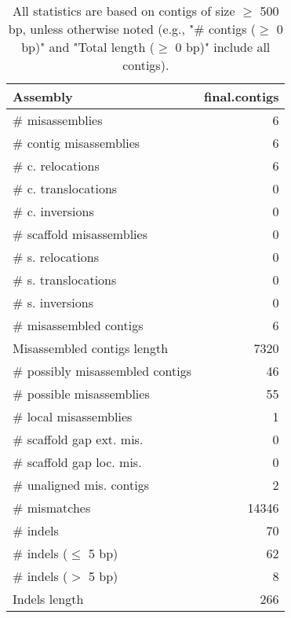 \documentclass[12pt,a4paper]{article}
\begin{document}
\begin{table}[ht]
\begin{center}
\caption{All statistics are based on contigs of size $\geq$ 500 bp, unless otherwise noted (e.g., "\# contigs ($\geq$ 0 bp)" and "Total length ($\geq$ 0 bp)" include all contigs).}
\begin{tabular}{|l*{1}{|r}|}
\hline
Assembly & final.contigs \\ \hline
\# misassemblies & 6 \\ \hline
\hspace{2mm}\# contig misassemblies & 6 \\ \hline
\hspace{5mm}\# c. relocations & 6 \\ \hline
\hspace{5mm}\# c. translocations & 0 \\ \hline
\hspace{5mm}\# c. inversions & 0 \\ \hline
\hspace{2mm}\# scaffold misassemblies & 0 \\ \hline
\hspace{5mm}\# s. relocations & 0 \\ \hline
\hspace{5mm}\# s. translocations & 0 \\ \hline
\hspace{5mm}\# s. inversions & 0 \\ \hline
\# misassembled contigs & 6 \\ \hline
Misassembled contigs length & 7320 \\ \hline
\# possibly misassembled contigs & 46 \\ \hline
\hspace{5mm}\# possible misassemblies & 55 \\ \hline
\# local misassemblies & 1 \\ \hline
\# scaffold gap ext. mis. & 0 \\ \hline
\# scaffold gap loc. mis. & 0 \\ \hline
\# unaligned mis. contigs & 2 \\ \hline
\# mismatches & 14346 \\ \hline
\# indels & 70 \\ \hline
\hspace{5mm}\# indels ($\leq$ 5 bp) & 62 \\ \hline
\hspace{5mm}\# indels ($>$ 5 bp) & 8 \\ \hline
Indels length & 266 \\ \hline
\end{tabular}
\end{center}
\end{table}
\end{document}
